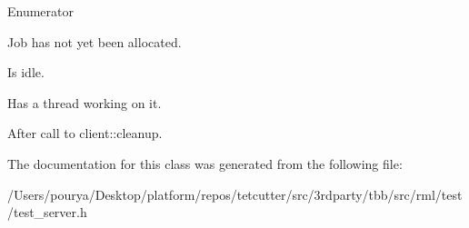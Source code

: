\begin{Desc}
\item[Enumerator]\par
\begin{description}
\item[{\em 
\hypertarget{classMyJob_a44f37d865cfb3f176ea9c11a1e8e8990a4e2de3a378e6ee8c06a02526b0633b6e}{}unallocated\label{classMyJob_a44f37d865cfb3f176ea9c11a1e8e8990a4e2de3a378e6ee8c06a02526b0633b6e}
}]Job has not yet been allocated. \item[{\em 
\hypertarget{classMyJob_a44f37d865cfb3f176ea9c11a1e8e8990a09d330bda86806a4a270dd6457de4f1c}{}idle\label{classMyJob_a44f37d865cfb3f176ea9c11a1e8e8990a09d330bda86806a4a270dd6457de4f1c}
}]Is idle. \item[{\em 
\hypertarget{classMyJob_a44f37d865cfb3f176ea9c11a1e8e8990aa0a3bdd0a6e7e629c60ec61e068d8c42}{}busy\label{classMyJob_a44f37d865cfb3f176ea9c11a1e8e8990aa0a3bdd0a6e7e629c60ec61e068d8c42}
}]Has a thread working on it. \item[{\em 
\hypertarget{classMyJob_a44f37d865cfb3f176ea9c11a1e8e8990a46229049d574a49884331f09889dc6c7}{}clean\label{classMyJob_a44f37d865cfb3f176ea9c11a1e8e8990a46229049d574a49884331f09889dc6c7}
}]After call to client\+::cleanup. \end{description}
\end{Desc}


The documentation for this class was generated from the following file\+:\begin{DoxyCompactItemize}
\item 
/\+Users/pourya/\+Desktop/platform/repos/tetcutter/src/3rdparty/tbb/src/rml/test/test\+\_\+server.\+h\end{DoxyCompactItemize}
